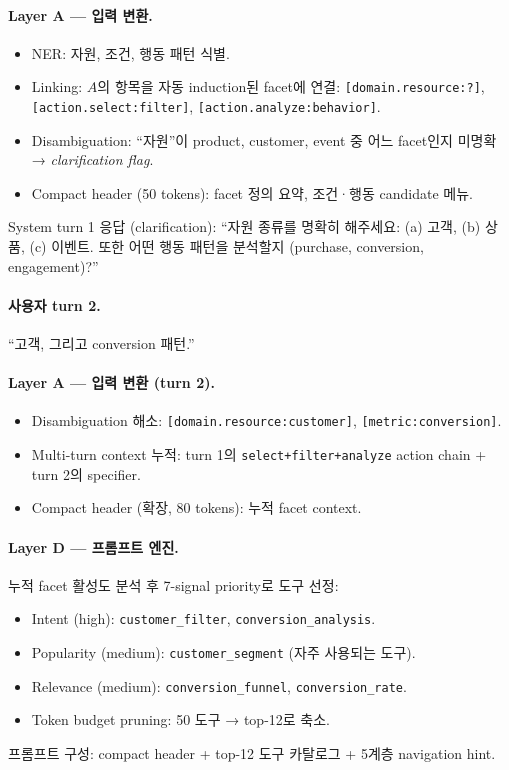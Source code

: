 \documentclass[11pt]{article}
\theoremstyle{definition}
\begin{document}
\paragraph{Layer A — 입력 변환.}
\begin{itemize}[leftmargin=*]
\item NER: 자원, 조건, 행동 패턴 식별.
\item Linking: $A$의 항목을 자동 induction된 facet에 연결: \texttt{[domain.resource:?]}, \texttt{[action.select:filter]}, \texttt{[action.analyze:behavior]}.
\item Disambiguation: ``자원''이 product, customer, event 중 어느 facet인지 미명확 → \emph{clarification flag}.
\item Compact header (50 tokens): facet 정의 요약, 조건·행동 candidate 메뉴.
\end{itemize}

System turn 1 응답 (clarification): ``자원 종류를 명확히 해주세요: (a) 고객, (b) 상품, (c) 이벤트. 또한 어떤 행동 패턴을 분석할지 (purchase, conversion, engagement)?''

\paragraph{사용자 turn 2.}
``고객, 그리고 conversion 패턴.''

\paragraph{Layer A — 입력 변환 (turn 2).}
\begin{itemize}[leftmargin=*]
\item Disambiguation 해소: \texttt{[domain.resource:customer]}, \texttt{[metric:conversion]}.
\item Multi-turn context 누적: turn 1의 \texttt{select+filter+analyze} action chain + turn 2의 specifier.
\item Compact header (확장, 80 tokens): 누적 facet context.
\end{itemize}

\paragraph{Layer D — 프롬프트 엔진.}
누적 facet 활성도 분석 후 7-signal priority로 도구 선정:
\begin{itemize}[leftmargin=*]
\item Intent (high): \texttt{customer\_filter}, \texttt{conversion\_analysis}.
\item Popularity (medium): \texttt{customer\_segment} (자주 사용되는 도구).
\item Relevance (medium): \texttt{conversion\_funnel}, \texttt{conversion\_rate}.
\item Token budget pruning: 50 도구 → top-12로 축소.
\end{itemize}
프롬프트 구성: compact header + top-12 도구 카탈로그 + 5계층 navigation hint.
\end{document}
